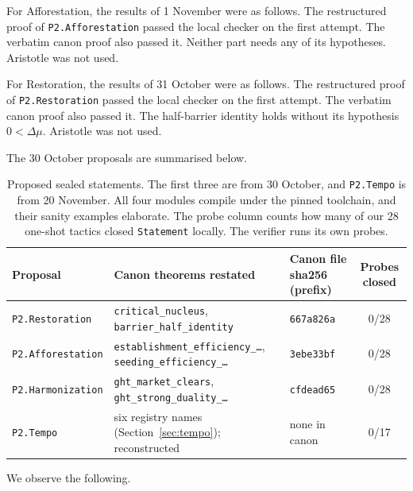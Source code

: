 \documentclass[11pt]{article}
\theoremstyle{definition}
\theoremstyle{remark}
\begin{document}
For Afforestation, the results of 1 November were as follows.
The restructured proof of \texttt{P2.Afforestation} passed the local checker on the first attempt.
The verbatim canon proof also passed it. Neither part needs any of its hypotheses.
Aristotle was not used.

For Restoration, the results of 31 October were as follows.
The restructured proof of \texttt{P2.Restoration} passed the local checker on the first attempt.
The verbatim canon proof also passed it.
The half-barrier identity holds without its hypothesis $0<\Delta\mu$.
Aristotle was not used.

The 30 October proposals are summarised below.
\begin{table}[h]
\centering\small
\begin{tabular}{@{}p{}p{}lc@{}}
\toprule
Proposal & Canon theorems restated & Canon file sha256 (prefix) & Probes closed \\
\midrule
\texttt{P2.Restoration} & \texttt{critical\_nucleus}, \texttt{barrier\_half\_identity} & \texttt{667a826a} & 0/28 \\
\texttt{P2.Afforestation} & \texttt{establishment\_efficiency\_\ldots}, \texttt{seeding\_efficiency\_\ldots} & \texttt{3ebe33bf} & 0/28 \\
\texttt{P2.Harmonization} & \texttt{ght\_market\_clears}, \texttt{ght\_strong\_duality\_\ldots} & \texttt{cfdead65} & 0/28 \\
\texttt{P2.Tempo} & six registry names (Section~\ref{sec:tempo}); reconstructed & none in canon & 0/17 \\
\bottomrule
\end{tabular}
\caption{Proposed sealed statements. The first three are from 30 October, and \texttt{P2.Tempo} is from 20 November. All four modules compile under the pinned toolchain, and their sanity examples elaborate.
The probe column counts how many of our 28 one-shot tactics closed \texttt{Statement} locally. The verifier runs its own probes.}
\end{table}
We observe the following.
\end{document}
